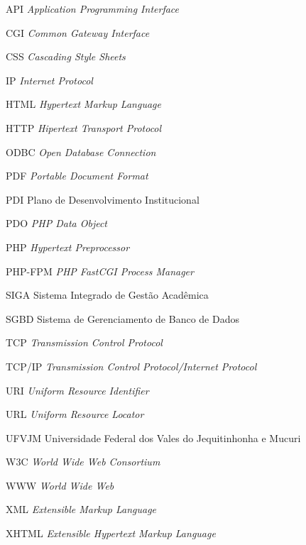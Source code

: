 \begin{siglas}
  \item[API] \textit{Application Programming Interface}
  \item[CGI] \textit{Common Gateway Interface}
  \item[CSS] \textit{Cascading Style Sheets}
  \item[IP] \textit{Internet Protocol}
  \item[HTML] \textit{Hypertext Markup Language}
  \item[HTTP] \textit{Hipertext Transport Protocol}
  \item[ODBC] \textit{Open Database Connection}
  \item[PDF] \textit{Portable Document Format}
  \item[PDI] Plano de Desenvolvimento Institucional
  \item[PDO] \textit{PHP Data Object}
  \item[PHP] \textit{Hypertext Preprocessor}
  \item[PHP-FPM] \textit{PHP FastCGI Process Manager}
  \item[SIGA] Sistema Integrado de Gestão Acadêmica
  \item[SGBD] Sistema de Gerenciamento de Banco de Dados
  \item[TCP] \textit{Transmission Control Protocol}
  \item[TCP/IP] \textit{Transmission Control Protocol/Internet Protocol	}
  \item[URI] \textit{Uniform Resource Identifier}
  \item[URL] \textit{Uniform Resource Locator}
  \item[UFVJM] Universidade Federal dos Vales do Jequitinhonha e Mucuri
  \item[W3C] \textit{World Wide Web Consortium}
  \item[WWW] \textit{World Wide Web}
  \item[XML] \textit{Extensible Markup Language}
  \item[XHTML] \textit{Extensible Hypertext Markup Language}
\end{siglas}